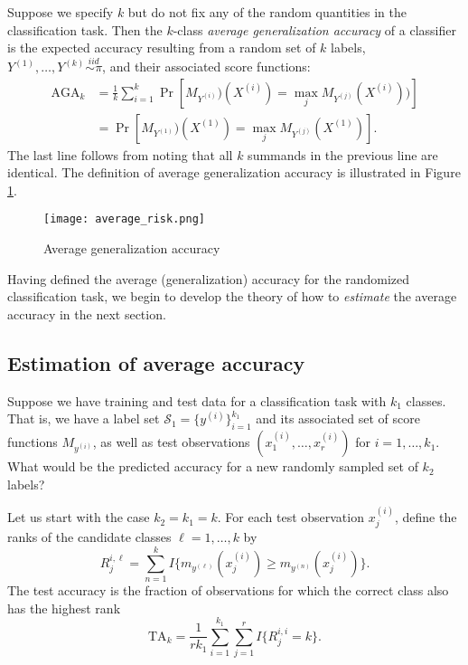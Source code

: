 \documentclass[12pt]{article}
\begin{document}
Suppose we specify $k$ but do not fix any of the random quantities in the
classification task.
Then the $k$-class \emph{average generalization accuracy} of
a classifier is the expected accuracy resulting from a random set of $k$ labels, $Y^{(1)}, \hdots, Y^{(k)} \stackrel{iid}{\sim \pi}$, and their associated score functions:
\begin{align*}
\text{AGA}_k &= \frac{1}{k} \sum_{i=1}^k \Pr[M_{Y^{(i)}})(X^{(i)}) = \max_j
M_{Y^{(j)}}(X^{(i)}))]
\\&= \Pr[M_{Y^{(1)}})(X^{(1)}) = \max_j M_{Y^{(j)}}(X^{(1)})].
\end{align*}
The last line follows from noting that all $k$ summands in the previous line are identical.
The definition of average generalization accuracy is illustrated in Figure \ref{fig:average_risk}.


\begin{figure}[h]
\centering
\texttt{[image: average\_risk.png]}
\caption{Average generalization accuracy}\label{fig:average_risk}
\end{figure}

Having defined the average (generalization) accuracy for the randomized classification
task, we begin to develop the theory of how to \emph{estimate} the
average accuracy in the next section.

\subsection{Estimation of average accuracy}\label{sec:estimation_average_accuracy}

Suppose we have training and test data for a classification task with $k_1$ classes.  That is, we have a label set $\mathcal{S}_1 =
\{y^{(i)}\}_{i=1}^{k_1}$ and its associated set of score functions
 $M_{y^{(i)}}$, as well as test observations $(x_1^{(i)},\hdots, x_{r}^{(i)})$ for $i =
1,\hdots, k_1$.  What would be the predicted accuracy for 
a new randomly sampled set of $k_2$ labels? 

Let us start with the case $k_2 = k_1 = k$.  For each test observation $x_j^{(i)}$, define the ranks of the candidate classes $\ell = 1,\hdots, k$ by
\[
R_{j}^{i, \ell} = \sum_{n = 1}^k I\{m_{y^{(\ell)}}(x_j^{(i)}) \geq m_{y^{(n)}}(x_j^{(i)})\}.
\]
The test accuracy is the fraction of observations for which the correct class also has the highest rank
\begin{equation}\label{eq:test_risk}
\text{TA}_k = \frac{1}{r k_1} \sum_{i=1}^{k_1} \sum_{j=1}^{r} I\{R_j^{i,i} = k\}.
\end{equation}
\end{document}
